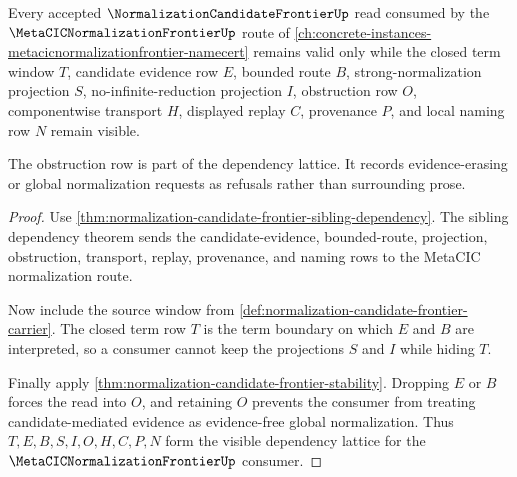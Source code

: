 \begin{theorem}
\label{thm:normalization-candidate-frontier-obligation-closure}
Every accepted $\NormalizationCandidateFrontierUp$ read consumed by the $\MetaCICNormalizationFrontierUp$ route of \autoref{ch:concrete-instances-metacicnormalizationfrontier-namecert} remains valid only while the closed term window $T$, candidate evidence row $E$, bounded route $B$, strong-normalization projection $S$, no-infinite-reduction projection $I$, obstruction row $O$, componentwise transport $H$, displayed replay $C$, provenance $P$, and local naming row $N$ remain visible.

The obstruction row is part of the dependency lattice. It records evidence-erasing or global normalization requests as refusals rather than surrounding prose.
\end{theorem}
\begin{proof}
Use \autoref{thm:normalization-candidate-frontier-sibling-dependency}. The sibling dependency theorem sends the candidate-evidence, bounded-route, projection, obstruction, transport, replay, provenance, and naming rows to the MetaCIC normalization route.

Now include the source window from \autoref{def:normalization-candidate-frontier-carrier}. The closed term row $T$ is the term boundary on which $E$ and $B$ are interpreted, so a consumer cannot keep the projections $S$ and $I$ while hiding $T$.

Finally apply \autoref{thm:normalization-candidate-frontier-stability}. Dropping $E$ or $B$ forces the read into $O$, and retaining $O$ prevents the consumer from treating candidate-mediated evidence as evidence-free global normalization. Thus $T,E,B,S,I,O,H,C,P,N$ form the visible dependency lattice for the $\MetaCICNormalizationFrontierUp$ consumer.
\end{proof}

